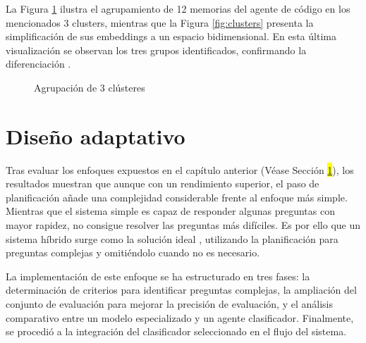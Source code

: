 La Figura \ref{fig:clustering-analysis} ilustra el agrupamiento de 12 memorias del agente de código en los mencionados 3 clusters, mientras que la Figura \ref{fig:clusters} presenta la simplificación de sus embeddings a un espacio bidimensional. En esta última visualización se observan los tres grupos identificados, confirmando la diferenciación  .

\begin{figure}[htbp]
    \centering
    \caption{Agrupación de 3 clústeres}
    \label{fig:clustering-analysis}
\end{figure}

\section{Diseño adaptativo}
Tras evaluar los enfoques expuestos en el capítulo anterior (Véase Sección \colorbox{yellow}{\ref{}}), los resultados muestran que aunque con un rendimiento superior, el paso de planificación añade una complejidad considerable frente al enfoque más simple. Mientras que el sistema simple es capaz de responder algunas preguntas con mayor rapidez, no consigue resolver las preguntas más difíciles. Es por ello que un sistema híbrido surge como la solución ideal \cite{}, utilizando la planificación para preguntas complejas y omitiéndolo cuando no es necesario.

La implementación de este enfoque se ha estructurado en tres fases: la determinación de criterios para identificar preguntas complejas, la ampliación del conjunto de evaluación para mejorar la precisión de evaluación, y el análisis comparativo entre un modelo especializado y un agente clasificador. Finalmente, se procedió a la integración del clasificador seleccionado en el flujo del sistema.

